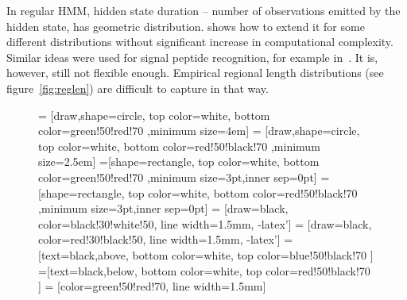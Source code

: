 \documentclass[fleqn,10pt,twoside]{gcb15submission}
\begin{document}
In regular HMM, hidden state duration -- number of observations emitted by the hidden state, has geometric distribution.
\citep{Durbin98biologicalsequence} shows how to extend it for some different distributions without significant increase in computational 
complexity. Similar ideas were used for signal peptide recognition, for example in~\citep{2004klla}. 
It is, however, still not flexible enough. Empirical regional length distributions (see figure~\ref{fig:reglen})
are difficult to capture in that way.

\begin{figure}[h]
\centering
{} = [draw,shape=circle, top color=white, bottom color=green!50!red!70 ,minimum size=4em]
 = [draw,shape=circle, top color=white, bottom color=red!50!black!70 ,minimum size=2.5em]
\def\radius{.7mm} 
=[shape=rectangle, top color=white, bottom color=green!50!red!70 ,minimum size=3pt,inner sep=0pt]
=[shape=rectangle, top color=white, bottom color=red!50!black!70 ,minimum size=3pt,inner sep=0pt]
\def\n{11}
  = [draw=black, color=black!30!white!50, line width=1.5mm, -latex'] 
  = [draw=black, color=red!30!black!50, line width=1.5mm, -latex']
=[text=black,above, bottom color=white, top color=blue!50!black!70  ]
=[text=black,below, bottom color=white, top color=red!50!black!70  ]
  = [color=green!50!red!70, line width=1.5mm]
\def\names{{"$O_{1,1}$","...","$O_{1,d_1}$", "...","$O_{k, 1}$", "...", "$O_{k, d_k}$"}}%
\end{figure}
\end{document}
